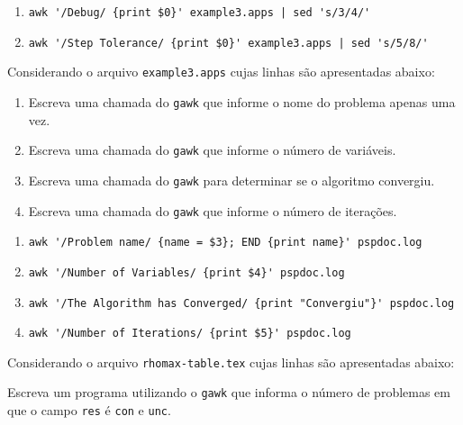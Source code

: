 \begin{Answer}[ref={0004}]
  \begin{enumerate}
    \item \lstinline+awk '/Debug/ {print $0}' example3.apps | sed 's/3/4/'+
    \item \lstinline+awk '/Step Tolerance/ {print $0}' example3.apps | sed 's/5/8/'+
  \end{enumerate}
\end{Answer}
\begin{Exercise}[label={0005}, difficulty={1}, origin={gawk}]
  Considerando o arquivo \lstinline+example3.apps+ cujas linhas são
  apresentadas abaixo:
  
  \begin{enumerate}
    \item Escreva uma chamada do \lstinline+gawk+ que informe o nome do
      problema apenas uma vez.
    \item Escreva uma chamada do \lstinline+gawk+ que informe o número de
      variáveis.
    \item Escreva uma chamada do \lstinline+gawk+ para determinar se o algoritmo
      convergiu.
    \item Escreva uma chamada do \lstinline+gawk+ que informe o número de
      iterações.
  \end{enumerate}
\end{Exercise}

\begin{Answer}[ref={0005}]
  \begin{enumerate}
    \item \lstinline+awk '/Problem name/ {name = $3}; END {print name}' pspdoc.log+
    \item \lstinline+awk '/Number of Variables/ {print $4}' pspdoc.log+
    \item \lstinline+awk '/The Algorithm has Converged/ {print "Convergiu"}' pspdoc.log+
    \item \lstinline+awk '/Number of Iterations/ {print $5}' pspdoc.log+
  \end{enumerate}
\end{Answer}
\begin{Exercise}[label={0006}, difficulty={2}, origin={gawk}]
  Considerando o arquivo \lstinline+rhomax-table.tex+ cujas linhas são
  apresentadas abaixo:
  
  Escreva um programa utilizando o \lstinline+gawk+ que informa o número de
  problemas em que o campo \lstinline+res+ é \lstinline+con+ e \lstinline+unc+.
\end{Exercise}

